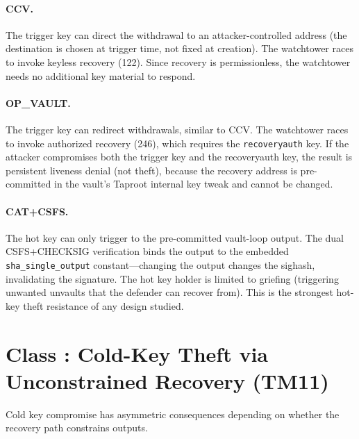 \paragraph{CCV.} The trigger key can direct the withdrawal to an attacker-controlled
address (the destination is chosen at trigger time, not fixed at creation). The
watchtower races to invoke keyless recovery (122\vB{}). Since recovery is
permissionless, the watchtower needs no additional key material to respond.

\paragraph{OP\_VAULT.} The trigger key can redirect withdrawals, similar to CCV. The
watchtower races to invoke authorized recovery (246\vB{}), which requires the
\texttt{recoveryauth} key. If the attacker compromises both the trigger key and the
recoveryauth key, the result is persistent liveness denial (not theft), because the
recovery address is pre-committed in the vault's Taproot internal key tweak and cannot
be changed.

\paragraph{CAT+CSFS.} The hot key can only trigger to the pre-committed vault-loop
output. The dual CSFS+CHECKSIG verification binds the output to the embedded
\texttt{sha\_single\_output} constant---changing the output changes the sighash,
invalidating the signature. The hot key holder is limited to griefing (triggering
unwanted unvaults that the defender can recover from). This is the strongest hot-key
theft resistance of any design studied.

\section{Class \classcold{}: Cold-Key Theft via Unconstrained Recovery (TM11)} \label{se:cold_key_recovery}

Cold key compromise has asymmetric consequences depending on whether the recovery
path constrains outputs.

